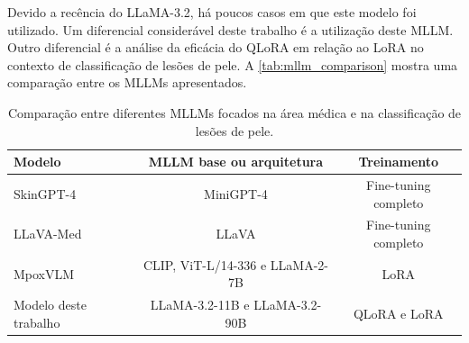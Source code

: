 Devido a recência do \ac{LLaMA}-3.2, há poucos casos em que este modelo foi utilizado. Um diferencial considerável deste trabalho é a utilização deste \ac{MLLM}. Outro
diferencial é a análise da eficácia do \ac{QLoRA} em relação ao \ac{LoRA} no contexto de classificação de lesões de pele. A \autoref{tab:mllm_comparison} mostra uma
comparação entre os \acp{MLLM} apresentados.

\begin{table}[ht]
    \caption{\small Comparação entre diferentes \acp{MLLM} focados na área médica e na classificação de lesões de pele.}
    \centering
    \begin{tabular}{l|cc}
        \hline
        Modelo                & MLLM base ou arquitetura                  & Treinamento            \\ \hline
        Skin\ac{GPT}-4        & Mini\ac{GPT}-4                            & Fine-tuning completo   \\
        \ac{LLaVA}-Med        & \ac{LLaVA}                                & Fine-tuning completo   \\
        MpoxVLM               & \ac{CLIP}, \ac{ViT}-L/14-336 e LLaMA-2-7B & \ac{LoRA}              \\
        Modelo deste trabalho & \ac{LLaMA}-3.2-11B e \ac{LLaMA}-3.2-90B   & \ac{QLoRA} e \ac{LoRA} \\ \hline
    \end{tabular}
    \label{tab:mllm_comparison}
\end{table}